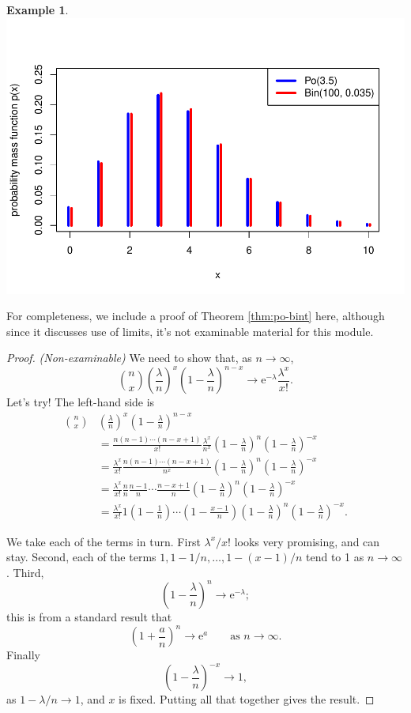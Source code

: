 \documentclass[
  a4paper,
]{book}
\theoremstyle{definition}
\theoremstyle{definition}
\newtheorem{example}{Example}[chapter]
\theoremstyle{definition}
\theoremstyle{definition}
\theoremstyle{remark}
\begin{document}
\begin{example}
\includegraphics{math1710_files/figure-latex/po-binom-pic-1.pdf}
\end{example}

For completeness, we include a proof of Theorem \ref{thm:po-bint} here, although since it discusses use of limits, it's not examinable material for this module.

\begin{proof}
\emph{(Non-examinable)}
We need to show that, as \(n \to \infty\),
\[ \binom nx \left(\frac{\lambda}{n}\right)^x \left(1 - \frac{\lambda}{n}\right)^{n-x}
\to \mathrm{e}^{-\lambda} \frac{\lambda^x}{x!} . \]
Let's try! The left-hand side is
\begin{align*}
\binom nx &\left(\frac{\lambda}{n}\right)^x \left(1 - \frac{\lambda}{n}\right)^{n-x} \\
  &= \frac{n(n-1)\cdots(n-x+1)}{x!} \frac{\lambda^x}{n^x} \left(1 - \frac{\lambda}{n}\right)^{n}\left(1 - \frac{\lambda}{n}\right)^{-x} \\
  &= \frac{\lambda^x}{x!} \frac{n(n-1)\cdots(n-x+1)}{n^x} \left(1 - \frac{\lambda}{n}\right)^{n}\left(1 - \frac{\lambda}{n}\right)^{-x} \\
  &= \frac{\lambda^x}{x!} \frac{n}{n} \frac{n-1}{n} \cdots \frac{n-x+1}{n} \left(1 - \frac{\lambda}{n}\right)^{n}\left(1 - \frac{\lambda}{n}\right)^{-x} \\
  &= \frac{\lambda^x}{x!} 1 \left(1 - \frac{1}{n}\right) \cdots \left(1 - \frac{x-1}{n}\right)  \left(1 - \frac{\lambda}{n}\right)^{n}\left(1 - \frac{\lambda}{n}\right)^{-x} .
\end{align*}

We take each of the terms in turn. First \(\lambda^x / x!\) looks very promising, and can stay. Second, each of the terms \(1, 1 - 1/n, \dots, 1 - (x-1)/n\) tend to 1 as \(n \to \infty\). Third,
\[ \left(1 - \frac{\lambda}{n}\right)^{n} \to \mathrm{e}^{-\lambda} ; \]
this is from a standard result that
\[ \left(1 + \frac{a}{n}\right)^{n} \to \mathrm{e}^{a} \qquad \text{as $n \to \infty$}. \]
Finally
\[\left(1 - \frac{\lambda}{n}\right)^{-x} \to 1 , \]
as \(1 - \lambda/n \to 1\), and \(x\) is fixed. Putting all that together gives the result.
\end{proof}
\end{document}
